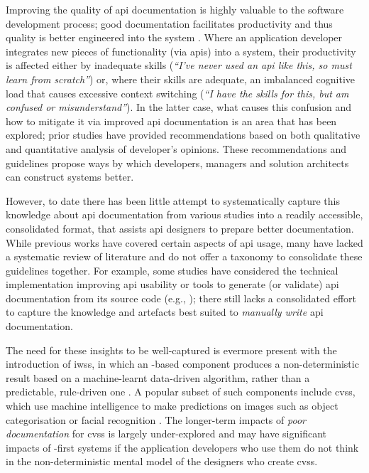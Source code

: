 Improving the quality of \gls{api} documentation is highly valuable to the software development process; good documentation facilitates productivity and thus quality is better engineered into the system \citep{mcleod2011factors}. Where an application developer integrates new pieces of functionality (via \glspl{api}) into a system, their productivity is affected either by inadequate skills (\textit{``I've never used an \gls{api} like this, so must learn from scratch''}) or, where their skills are adequate, an imbalanced cognitive load that causes excessive context switching (\textit{``I have the skills for this, but am confused or misunderstand''}). In the latter case, what causes this confusion and how to mitigate it via improved \gls{api} documentation is an area that has been explored; prior studies have provided recommendations based on both qualitative and quantitative analysis of developer's opinions. These recommendations and guidelines propose ways by which developers, managers and solution architects can construct systems better.

However, to date there has been little attempt to systematically capture this knowledge about \gls{api} documentation from various studies into a readily accessible, consolidated format, that assists \gls{api} designers to prepare better documentation. While previous works have covered certain aspects of \gls{api} usage, many have lacked a systematic review of literature and do not offer a taxonomy to consolidate these guidelines together. For example, some studies have considered the technical implementation improving \gls{api} usability or tools to generate (or validate) \gls{api} documentation from its source code (e.g., \citep{Nybom:2018ef,Watson:2012uy,Maalej:2013uu}); there still lacks a consolidated effort to capture the knowledge and artefacts best suited to \textit{manually write} \gls{api} documentation.

 The need for these insights to be well-captured is evermore present with the introduction of \glspl{iws}, in which an -based component produces a non-deterministic result based on a machine-learnt data-driven algorithm, rather than a predictable, rule-driven one \citep{Cummaudo:2019va}. A popular subset of such components include \glspl{cvs}, which use machine intelligence to make predictions on images such as object categorisation or facial recognition . The longer-term impacts of \textit{poor documentation} for \glspl{cvs} is largely under-explored and may have significant impacts of -first systems if the application developers who use them do not think in the non-deterministic mental model of the designers who create \glspl{cvs}.

